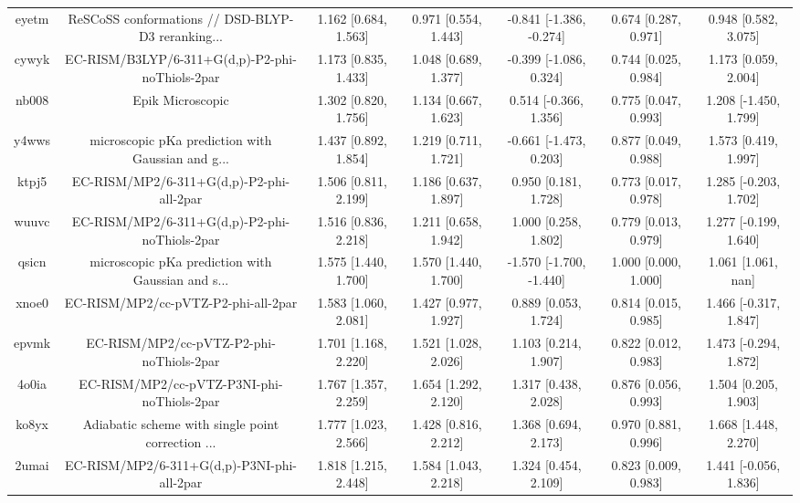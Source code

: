 \documentclass{article}
\begin{document}
\begin{center}
\begin{longtable}{|ccccccc|}
 eyetm &  ReSCoSS conformations // DSD-BLYP-D3 reranking... &     1.162 [0.684, 1.563] &     0.971 [0.554, 1.443] &  -0.841 [-1.386, -0.274] &  0.674 [0.287, 0.971] &    0.948 [0.582, 3.075] \\
 cywyk &    EC-RISM/B3LYP/6-311+G(d,p)-P2-phi-noThiols-2par &     1.173 [0.835, 1.433] &     1.048 [0.689, 1.377] &   -0.399 [-1.086, 0.324] &  0.744 [0.025, 0.984] &    1.173 [0.059, 2.004] \\
 nb008 &                                   Epik Microscopic &     1.302 [0.820, 1.756] &     1.134 [0.667, 1.623] &    0.514 [-0.366, 1.356] &  0.775 [0.047, 0.993] &   1.208 [-1.450, 1.799] \\
 y4wws &  microscopic pKa prediction with Gaussian and g... &     1.437 [0.892, 1.854] &     1.219 [0.711, 1.721] &   -0.661 [-1.473, 0.203] &  0.877 [0.049, 0.988] &    1.573 [0.419, 1.997] \\
 ktpj5 &           EC-RISM/MP2/6-311+G(d,p)-P2-phi-all-2par &     1.506 [0.811, 2.199] &     1.186 [0.637, 1.897] &     0.950 [0.181, 1.728] &  0.773 [0.017, 0.978] &   1.285 [-0.203, 1.702] \\
 wuuvc &      EC-RISM/MP2/6-311+G(d,p)-P2-phi-noThiols-2par &     1.516 [0.836, 2.218] &     1.211 [0.658, 1.942] &     1.000 [0.258, 1.802] &  0.779 [0.013, 0.979] &   1.277 [-0.199, 1.640] \\
 qsicn &  microscopic pKa prediction with Gaussian and s... &     1.575 [1.440, 1.700] &     1.570 [1.440, 1.700] &  -1.570 [-1.700, -1.440] &  1.000 [0.000, 1.000] &      1.061 [1.061, nan] \\
 xnoe0 &                EC-RISM/MP2/cc-pVTZ-P2-phi-all-2par &     1.583 [1.060, 2.081] &     1.427 [0.977, 1.927] &     0.889 [0.053, 1.724] &  0.814 [0.015, 0.985] &   1.466 [-0.317, 1.847] \\
 epvmk &           EC-RISM/MP2/cc-pVTZ-P2-phi-noThiols-2par &     1.701 [1.168, 2.220] &     1.521 [1.028, 2.026] &     1.103 [0.214, 1.907] &  0.822 [0.012, 0.983] &   1.473 [-0.294, 1.872] \\
 4o0ia &         EC-RISM/MP2/cc-pVTZ-P3NI-phi-noThiols-2par &     1.767 [1.357, 2.259] &     1.654 [1.292, 2.120] &     1.317 [0.438, 2.028] &  0.876 [0.056, 0.993] &    1.504 [0.205, 1.903] \\
 ko8yx &  Adiabatic scheme with single point correction ... &     1.777 [1.023, 2.566] &     1.428 [0.816, 2.212] &     1.368 [0.694, 2.173] &  0.970 [0.881, 0.996] &    1.668 [1.448, 2.270] \\
 2umai &         EC-RISM/MP2/6-311+G(d,p)-P3NI-phi-all-2par &     1.818 [1.215, 2.448] &     1.584 [1.043, 2.218] &     1.324 [0.454, 2.109] &  0.823 [0.009, 0.983] &   1.441 [-0.056, 1.836] \\

\end{longtable}
\end{center}
\end{document}
